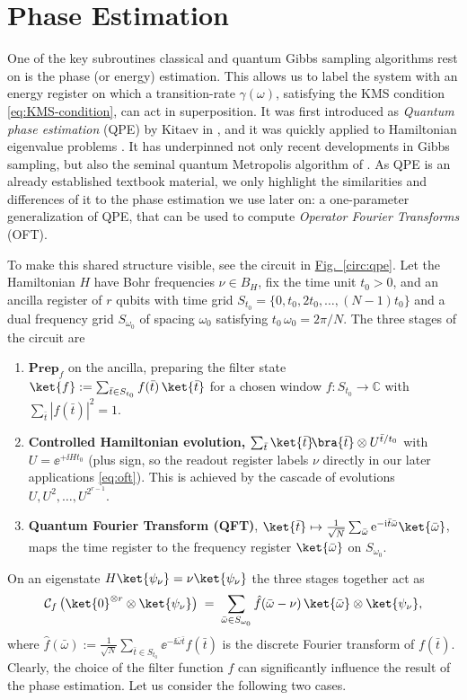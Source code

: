 \smallskip
\section{Phase Estimation} One of the key subroutines classical and quantum Gibbs sampling algorithms rest on is the phase (or energy) estimation. This allows us to label the system with an energy register on which a transition-rate $\gamma(\omega)$, satisfying the KMS condition \eqref{eq:KMS-condition}, can act in superposition. It was first introduced as \emph{Quantum phase estimation} (QPE) by Kitaev in \cite{kitaev1997quantum,cleve1998quantum}, and it was quickly applied to Hamiltonian eigenvalue problems \cite{abrams1999quantum}. It has underpinned not only recent developments in Gibbs sampling, but also the seminal quantum Metropolis algorithm of \cite{temme2011quantum}. As QPE is an already established textbook material, we only highlight the similarities and differences of it to the phase estimation we use later on: a one-parameter generalization of QPE, that can be used to compute \emph{Operator Fourier Transforms} (OFT).

To make this shared structure visible, see the circuit in \hyperref[circ:qpe]{Fig.~\ref*{circ:qpe}}. Let the Hamiltonian $H$ have Bohr frequencies $\nu \in B_H$, fix the time unit $t_0>0$, and an ancilla register of $r$ qubits with time grid $S_{t_0} = \{0, t_0, 2t_0, \dots, (N{-}1)t_0\}$ and a dual frequency grid $S_{\omega_0}$ of spacing $\omega_0$ satisfying $t_0\,\omega_0 = 2\pi/N$. The three stages of the circuit are
\begin{enumerate}
    \item $\textbf{Prep}_f$ on the ancilla, preparing the filter state $\ket{f} := \sum_{\bar t \in S_{t_0}} f(\bar t)\,\ket{\bar t}$ for a chosen window $f : S_{t_0} \to \mathbb{C}$ with $\sum_{\bar t}|f(\bar t)|^2 = 1$.
    \item \textbf{Controlled Hamiltonian evolution,} $\sum_{\bar t}\ket{\bar t}\!\bra{\bar t}\otimes U^{\bar t/t_0}$ with $U = \ee^{+\ii H t_0}$ (plus sign, so the readout register labels $\nu$ directly in our later applications \eqref{eq:oft}). This is achieved by the cascade of evolutions $U, U^2, \ldots, U^{2^{r-1}}$.
    \item \textbf{Quantum Fourier Transform (QFT)}, $\ket{\bar t}\mapsto\frac{1}{\sqrt N}\sum_{\bar\omega}\ee^{-\ii\bar t\bar\omega}\ket{\bar\omega}$, maps the time register to the frequency register $\ket{\bar \omega}$ on $S_{\omega_0}$.
\end{enumerate}
On an eigenstate $H\ket{\psi_\nu} = \nu\ket{\psi_\nu}$ the three stages together act as
\begin{equation} \label{eq:qpe-unified}
    \mathcal{C}_f \,\bigl(\ket{0}^{\otimes r} \otimes \ket{\psi_\nu}\bigr)
\;=\; \sum_{\bar\omega \in S_{\omega_0}} \hat f(\bar\omega - \nu)\,\ket{\bar\omega} \otimes \ket{\psi_\nu},
\end{equation}
where $\hat f(\bar\omega) := \frac{1}{\sqrt{N}} \sum_{\bar t \in S_{t_0}} \ee^{-\ii \bar\omega \bar t} f(\bar t)$ is the discrete Fourier transform of $f(\bar{t})$. Clearly, the choice of the filter function $f$ can significantly influence the result of the phase estimation. Let us consider
the following two cases.

